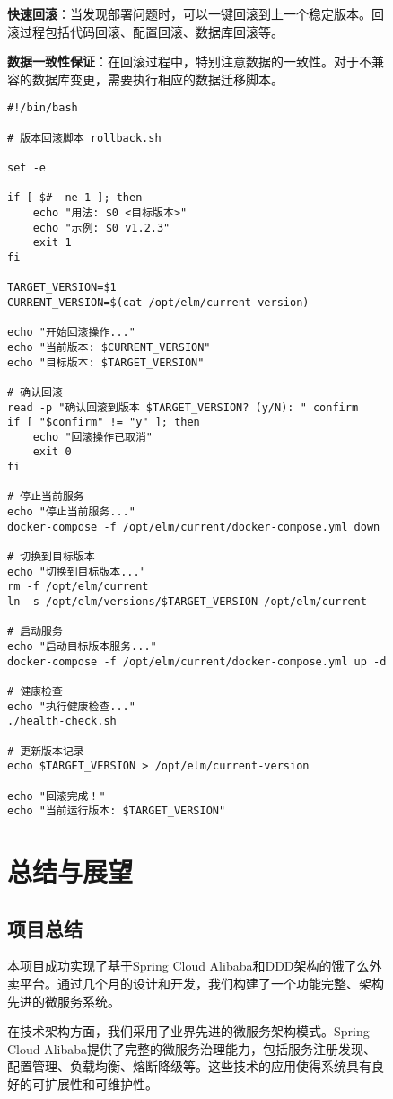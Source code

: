 \documentclass[a4paper,12pt]{article}
\begin{document}
\begin{figure}[H]
\textbf{快速回滚}：当发现部署问题时，可以一键回滚到上一个稳定版本。回滚过程包括代码回滚、配置回滚、数据库回滚等。

\textbf{数据一致性保证}：在回滚过程中，特别注意数据的一致性。对于不兼容的数据库变更，需要执行相应的数据迁移脚本。

\begin{lstlisting}[caption=版本回滚脚本]
#!/bin/bash

# 版本回滚脚本 rollback.sh

set -e

if [ $# -ne 1 ]; then
    echo "用法: $0 <目标版本>"
    echo "示例: $0 v1.2.3"
    exit 1
fi

TARGET_VERSION=$1
CURRENT_VERSION=$(cat /opt/elm/current-version)

echo "开始回滚操作..."
echo "当前版本: $CURRENT_VERSION"
echo "目标版本: $TARGET_VERSION"

# 确认回滚
read -p "确认回滚到版本 $TARGET_VERSION? (y/N): " confirm
if [ "$confirm" != "y" ]; then
    echo "回滚操作已取消"
    exit 0
fi

# 停止当前服务
echo "停止当前服务..."
docker-compose -f /opt/elm/current/docker-compose.yml down

# 切换到目标版本
echo "切换到目标版本..."
rm -f /opt/elm/current
ln -s /opt/elm/versions/$TARGET_VERSION /opt/elm/current

# 启动服务
echo "启动目标版本服务..."
docker-compose -f /opt/elm/current/docker-compose.yml up -d

# 健康检查
echo "执行健康检查..."
./health-check.sh

# 更新版本记录
echo $TARGET_VERSION > /opt/elm/current-version

echo "回滚完成！"
echo "当前运行版本: $TARGET_VERSION"
\end{lstlisting}

\section{总结与展望}

\subsection{项目总结}

本项目成功实现了基于Spring Cloud Alibaba和DDD架构的饿了么外卖平台。通过几个月的设计和开发，我们构建了一个功能完整、架构先进的微服务系统。

在技术架构方面，我们采用了业界先进的微服务架构模式。Spring Cloud Alibaba提供了完整的微服务治理能力，包括服务注册发现、配置管理、负载均衡、熔断降级等。这些技术的应用使得系统具有良好的可扩展性和可维护性。


\end{figure}
\end{document}

